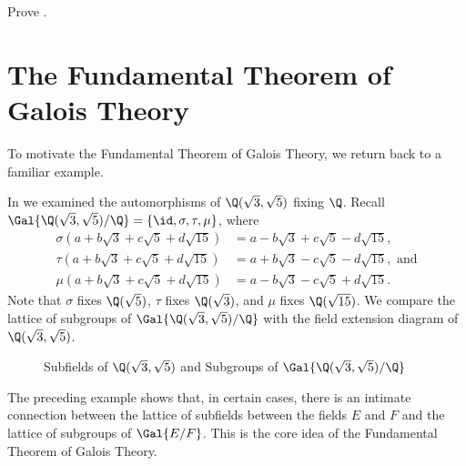 \begin{exercise}\label{exercise-intermediate-field-of-galois-extension-is-galois-extension}
    Prove .
\end{exercise}

\section{The Fundamental Theorem of Galois Theory}
To motivate the Fundamental Theorem of Galois Theory, we return back to a familiar example.

\begin{example}
    In  we examined the automorphisms of $\Q(\sqrt3, \sqrt5)$ fixing $\Q$. Recall $\Gal{\Q(\sqrt3,\sqrt5)/\Q} = \{\id, \sigma, \tau, \mu\}$, where
    \begin{align*}
        \sigma(a + b\sqrt3 + c\sqrt5 + d\sqrt{15}) &= a - b\sqrt3 + c\sqrt5 - d\sqrt{15},\\
        \tau(a + b\sqrt3 + c\sqrt5 + d\sqrt{15}) &= a + b\sqrt3 - c\sqrt5 - d\sqrt{15}, \text{ and}\\
        \mu(a + b\sqrt3 + c\sqrt5 + d\sqrt{15}) &= a - b\sqrt3 - c\sqrt5 + d\sqrt{15}.
    \end{align*}
    Note that $\sigma$ fixes $\Q(\sqrt5)$, $\tau$ fixes $\Q(\sqrt3)$, and $\mu$ fixes $\Q(\sqrt{15})$. We compare the lattice of subgroups of $\Gal{\Q(\sqrt3,\sqrt5)/\Q}$ with the field extension diagram of $\Q(\sqrt3, \sqrt5)$.

    \begin{figure}[H]
        \centering
        \caption{Subfields of $\Q(\sqrt3,\sqrt5)$ and Subgroups of $\Gal{\Q(\sqrt3,\sqrt5)/\Q}$}
    \end{figure}
\end{example}

The preceding example shows that, in certain cases, there is an intimate connection between the lattice of subfields between the fields $E$ and $F$ and the lattice of subgroups of $\Gal{E/F}$. This is the core idea of the Fundamental Theorem of Galois Theory.

        
